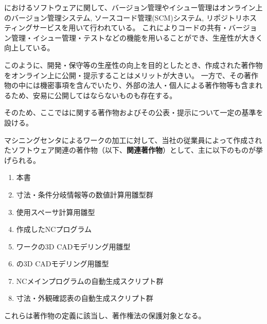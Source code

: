 

\DMC におけるソフトウェアに関して、バージョン管理やイシュー管理はオンライン上のバージョン管理システム, ソースコード管理(SCM)システム, リポジトリホスティングサービスを用いて行われている。
これによりコードの共有・バージョン管理・イシュー管理・テストなどの機能を用いることができ、生産性が大きく向上している。

このように、開発・保守等の生産性の向上を目的としたとき、作成された著作物をオンライン上に公開・提示することはメリットが大きい。
一方で、その著作物の中には機密事項を含んでいたり、外部の法人・個人による著作物等も含まれるため、安易に公開してはならないものも存在する。

そのため、ここでは\DMC に関する著作物およびその公表・提示について一定の基準を設ける。



マシニングセンタによるワークの加工に対して、当社の従業員によって作成されたソフトウェア関連の著作物（以下、\textbf{関連著作物}）として、主に以下のものが挙げられる。
\begin{enumerate}[label=\sarrow]
\item 本書
\item 寸法・条件分岐情報等の数値計算用雛型群
\item {}使用スペーサ計算用雛型
\item 作成したNCプログラム
\item {}ワークの3D CADモデリング用雛型
\item {}\nameIDTaper の3D CADモデリング用雛型
\item {}NCメインプログラムの自動生成スクリプト群
\item {}寸法・外観確認表の自動生成スクリプト群
\end{enumerate}
これらは著作物の定義に該当し、著作権法の保護対象となる。



